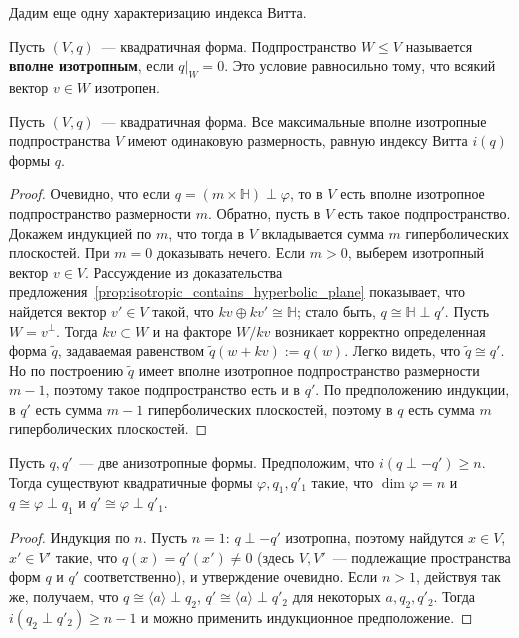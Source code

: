 \documentclass[a4paper,oneside,12pt]{article}
\theoremstyle{plain} { \swapnumbers
\newtheorem{theorem}{Теорема}[subsection]
\newtheorem{corollary}[theorem]{Следствие}
\newtheorem{lemma}[theorem]{Лемма}
\newtheorem{proposition}[theorem]{Утверждение}
\newtheorem{claim}[theorem]{Факт}
}
\theoremstyle{definition} { \swapnumbers
\newtheorem{definition}[theorem]{Определение}
\newtheorem{notation}[theorem]{Обозначение}
\newtheorem{remark}[theorem]{Замечание}
\newtheorem{remarks}[theorem]{Замечания}
\newtheorem{example}[theorem]{Пример}
\newtheorem{examples}[theorem]{Примеры}
\newtheorem{sssection}[theorem]{}
}
\def\tilde{\widetilde}
\def\ph{\varphi}
\def\la{\langle}
\def\ra{\rangle}
\begin{document}

Дадим еще одну характеризацию индекса Витта.

\begin{definition}
Пусть $(V,q)$~--- квадратичная форма. Подпространство $W\leq V$ называется {\bf вполне изотропным},
если $q|_W=0$. Это условие равносильно тому, что всякий вектор $v\in W$ изотропен.
\end{definition}

\begin{proposition}\label{prop:totally_isotropic_subspaces}
Пусть $(V,q)$~--- квадратичная форма. Все максимальные вполне изотропные подпространства $V$
имеют одинаковую размерность, равную индексу Витта $i(q)$ формы $q$.
\end{proposition}
\begin{proof}
Очевидно, что если $q=(m\times\mathbb H)\perp\ph$, то в $V$ есть вполне изотропное подпространство
размерности $m$. Обратно, пусть в $V$ есть такое подпространство. Докажем индукцией по $m$, что
тогда в $V$ вкладывается сумма $m$ гиперболических плоскостей. При $m=0$ доказывать нечего.
Если $m>0$, выберем изотропный вектор $v\in V$. Рассуждение из
доказательства предложения~\ref{prop:isotropic_contains_hyperbolic_plane} показывает, что 
найдется вектор $v'\in V$ такой, что $kv\oplus kv'\cong\mathbb H$; стало быть, $q\cong\mathbb H\perp q'$.
Пусть $W=v^\perp$. Тогда $kv\subset W$ и на факторе $W/kv$ возникает корректно определенная
форма $\tilde q$, задаваемая равенством $\tilde q(w+kv):=q(w)$. Легко видеть, что $\tilde q\cong q'$.
Но по построению $\tilde q$ имеет вполне изотропное подпространство размерности $m-1$,
поэтому такое подпространство есть и в $q'$. По предположению индукции, в $q'$ есть сумма $m-1$
гиперболических плоскостей, поэтому в $q$ есть сумма $m$ гиперболических плоскостей.
\end{proof}

\begin{lemma}\label{lem:isotropicdiff}
Пусть $q, q'$~--- две анизотропные формы. Предположим, что $i(q\perp -q')\geq n$. Тогда существуют
квадратичные формы $\ph, q_1, q'_1$ такие, что $\dim\ph=n$ и $q\cong\ph\perp q_1$ и $q'\cong\ph\perp q'_1$.
\end{lemma}
\begin{proof}
Индукция по $n$. Пусть $n=1$: $q\perp -q'$ изотропна, поэтому найдутся $x\in V$, $x'\in V'$ такие, что
$q(x)=q'(x')\neq 0$ (здесь $V, V'$~--- подлежащие пространства форм $q$ и $q'$ соответственно), 
и утверждение очевидно. Если $n>1$, действуя так же, получаем, что $q\cong\la a\ra\perp q_2$,
$q'\cong\la a\ra\perp q'_2$ для некоторых $a,q_2,q'_2$. Тогда $i(q_2\perp q'_2)\geq n-1$ и
можно применить индукционное предположение.
\end{proof}
\end{document}
